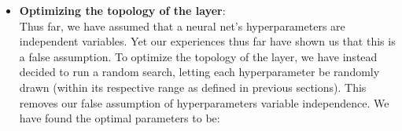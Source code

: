 \begin{itemize}[topsep=-10pt]
  \begin{figure}[!ht]
    \centering
    \qquad
\end{figure}
  
\item \textbf{Optimizing the topology of the layer}:\\
  Thus far, we have assumed that a neural net's hyperparameters are independent variables.
  Yet our experiences thus far have shown us that this is a false assumption.
  To optimize the topology of the layer, we have instead decided to run a random search,
  letting each hyperparameter be randomly drawn (within its respective range as defined in previous sections).
  This removes our false assumption of hyperparameters variable independence.
  We have found the optimal parameters to be:
  

\end{itemize}
